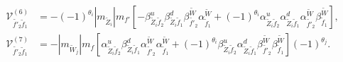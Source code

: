 \documentclass[final,3p,times,pdflatex]{elsarticle}
\begin{document}
\begin{align}
\mathcal{V}_{\tilde{f'}_2 \tilde{f}_1}^{(6)} &= -(-1)^{\theta_i} |m_{\tilde{Z}_i}| m_{f'} \left[-\beta_{\tilde{Z}_i \tilde{f}_2}^{u} \beta_{\tilde{Z}_i \tilde{f}_1}^{d} \beta_{\tilde{f'}_2}^{\tilde{W}} \alpha_{\tilde{f}_1}^{\tilde{W}} + (-1)^{\theta_i} \alpha_{\tilde{Z}_i \tilde{f}_2}^{u} \alpha_{\tilde{Z}_i \tilde{f}_1}^{d} \alpha_{\tilde{f'}_2}^{\tilde{W}} \beta_{\tilde{f}_1}^{\tilde{W}}\right], \\
\mathcal{V}_{\tilde{f'}_2 \tilde{f}_1}^{(7)} &= -|m_{\tilde{W}_j}|m_{f}\left[ \alpha_{\tilde{Z}_i \tilde{f}_2}^{u} \beta_{\tilde{Z}_i \tilde{f}_1}^{d} \alpha_{\tilde{f'}_2}^{\tilde{W}} \alpha_{\tilde{f}_1}^{\tilde{W}} + (-1)^{\theta_i} \beta_{\tilde{Z}_i \tilde{f}_2}^{u} \alpha_{\tilde{Z}_i \tilde{f}_1}^{d} \beta_{\tilde{f'}_2}^{\tilde{W}} \beta_{\tilde{f}_1}^{\tilde{W}}\right](-1)^{\theta_j}. \\
\end{align}
\end{document}
